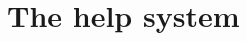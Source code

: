 \documentclass[Orbiter User Manual.tex]{subfiles}
\begin{document}
\section{The help system}

\end{document}

